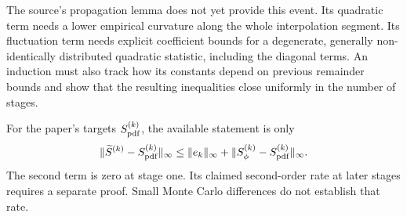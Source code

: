 \documentclass[11pt]{article}
\newcommand{\norm}[1]{\lVert #1\rVert}
\theoremstyle{remark}
\begin{document}
\noindent The source's propagation lemma does not yet provide this event.
Its quadratic term needs a lower empirical curvature along the whole
interpolation segment. Its fluctuation term needs explicit coefficient
bounds for a degenerate, generally non-identically distributed quadratic
statistic, including the diagonal terms. An induction must also track how
its constants depend on previous remainder bounds and show that the
resulting inequalities close uniformly in the number of stages.

For the paper's targets \(S^{(k)}_{\rm pdf}\), the available statement is only
\[
 \norm{\widetilde S^{(k)}-S^{(k)}_{\rm pdf}}_\infty
 \le\norm{e_k}_\infty+
 \norm{S_\phi^{(k)}-S^{(k)}_{\rm pdf}}_\infty.
\]
The second term is zero at stage one. Its claimed second-order rate at
later stages requires a separate proof. Small Monte Carlo differences
do not establish that rate.
\end{document}
